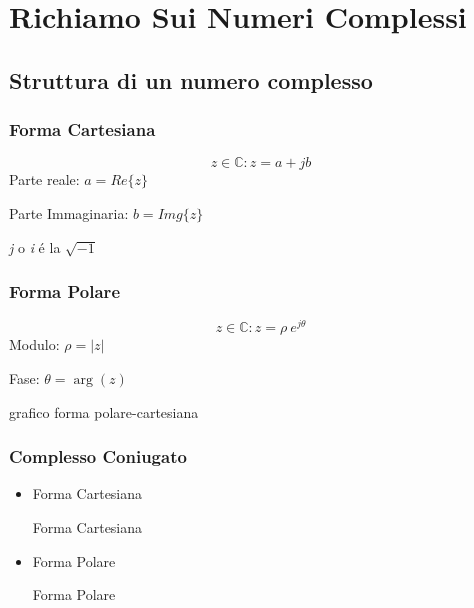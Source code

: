 \section{Richiamo Sui Numeri Complessi}
\subsection{Struttura di un numero complesso}

    \subsubsection{Forma Cartesiana}
            \begin{center}
                \[
                  z \in \mathbb{C} : z = a + jb
                \]
                Parte reale: $a=Re\{z\}$


                \vspace{0.1cm}
                Parte Immaginaria: $b=Img\{z\}$

                \vspace{0.1cm}
                {\em j} o {\em i} é la $\sqrt{-1}$  
            \end{center}
            
    \subsubsection{Forma Polare}
        \begin{center}
            \[
                z \in \mathbb{C} : z = \rho \ e^{j\theta}
            \]
            Modulo: $\rho = |z|$


            \vspace{0.1cm}
            Fase: $\theta = \arg(z)$

        \end{center}    
        grafico forma polare-cartesiana
        
    \subsubsection{Complesso Coniugato}
        \begin{itemize}
            \item {Forma Cartesiana
                \begin{center}
                    Forma Cartesiana
                \end{center}
            }
            \item {Forma Polare
                \begin{center}
                    Forma Polare
                \end{center}
            }           
        \end{itemize}


